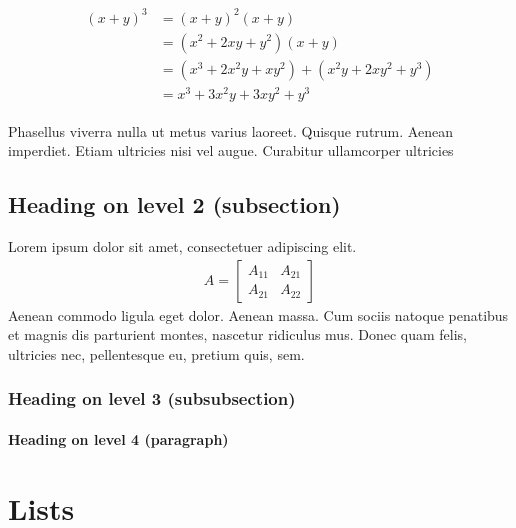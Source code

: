 \documentclass[paper=a4, fontsize=11pt]{scrartcl} %
\numberwithin{equation}{section} %
\numberwithin{figure}{section} %
\numberwithin{table}{section} %
\begin{document}
\begin{align} 
\begin{split}
(x+y)^3 	&= (x+y)^2(x+y)\\
&=(x^2+2xy+y^2)(x+y)\\
&=(x^3+2x^2y+xy^2) + (x^2y+2xy^2+y^3)\\
&=x^3+3x^2y+3xy^2+y^3
\end{split}					
\end{align}

Phasellus viverra nulla ut metus varius laoreet. Quisque rutrum. Aenean imperdiet. Etiam ultricies nisi vel augue. Curabitur ullamcorper ultricies


\subsection{Heading on level 2 (subsection)}

Lorem ipsum dolor sit amet, consectetuer adipiscing elit. 
\begin{align}
A = 
\begin{bmatrix}
A_{11} & A_{21} \\
A_{21} & A_{22}
\end{bmatrix}
\end{align}
Aenean commodo ligula eget dolor. Aenean massa. Cum sociis natoque penatibus et magnis dis parturient montes, nascetur ridiculus mus. Donec quam felis, ultricies nec, pellentesque eu, pretium quis, sem.


\subsubsection{Heading on level 3 (subsubsection)}

\lipsum[3] %

\paragraph{Heading on level 4 (paragraph)}

\lipsum[6] %


\section{Lists}
\end{document}
